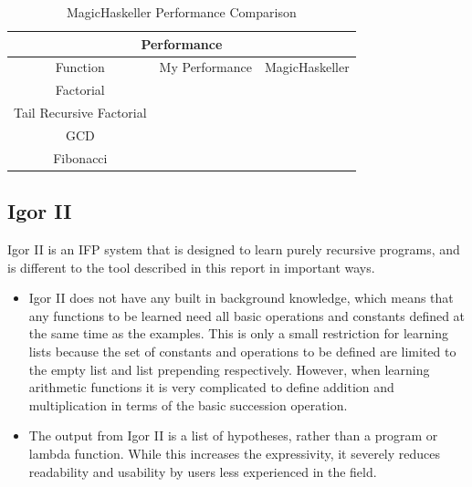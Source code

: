 \begin{table}[h!]
\centering
\begin{tabular}{|c|c|c|}
\hline
\multicolumn{3}{|c|}{\textbf{Performance}}\\
\hline
Function & My Performance & MagicHaskeller \\
\hline
Factorial & & \\
\hline
Tail Recursive Factorial & & \\
\hline
GCD & & \\
\hline
Fibonacci & & \\
\hline
\end{tabular}
\caption{MagicHaskeller Performance Comparison }
\label{table:2}
\end{table}

\subsection{Igor II}
Igor II \cite{Kitzelmann2006} is an IFP system that is designed to learn purely recursive programs, and is different to the tool described in this report in important ways.
\begin{itemize}
\item Igor II does not have any built in background knowledge, which means that any functions to be learned need all basic operations and constants defined at the same time as the examples. This is only a small restriction for learning lists because the set of constants and operations to be defined are limited to the empty list and list prepending respectively. However, when learning arithmetic functions it is very complicated to define addition and multiplication in terms of the basic succession operation.
\item The output from Igor II is a list of hypotheses, rather than a program or lambda function. While this increases the expressivity, it severely reduces readability and usability by users less experienced in the field.
\end{itemize}


\pagebreak
%
%